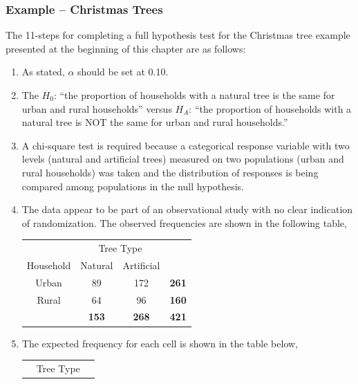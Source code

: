 \documentclass[10pt,openany]{book}\usepackage[]{graphicx}\usepackage[]{color}
\begin{document}
\subsubsection{Example -- Christmas Trees}
The 11-steps  for completing a full hypothesis test for the Christmas tree example presented at the beginning of this chapter are as follows:
  \begin{enumerate}
    \item As stated, $\alpha$ should be set at 0.10.
    \item The $H_{0}$: ``the proportion of households with a natural tree is the same for urban and rural households'' versus $H_{A}$: ``the proportion of households with a natural tree is NOT the same for urban and rural households.''
    \item A chi-square test is required because a categorical response variable with two levels (natural and artificial trees) measured on two populations (urban and rural households) was taken and the distribution of responses is being compared among populations in the null hypothesis.
    \item The data appear to be part of an observational study with no clear indication of randomization.  The observed frequencies are shown in the following table,
      \begin{center}
        \begin{tabular}{c|c|c|c|}
          \multicolumn{1}{c}{} & \multicolumn{2}{c}{Tree Type} & \multicolumn{1}{c}{} \\
          \cline{2-3}
          Household & Natural & Artificial & \multicolumn{1}{c}{} \\
          \hline
          \multicolumn{1}{|c|}{Urban} & 89 & 172 & \textbf{261} \\
          \hline
          \multicolumn{1}{|c|}{Rural} & 64 & 96 & \textbf{160} \\
          \hline
           & \textbf{153} & \textbf{268} & \textbf{421} \\
          \cline{2-4}
        \end{tabular}
      \end{center}
    \item The expected frequency for each cell is shown in the table below,
      \begin{center}
        \begin{tabular}{c|c|c|c|}
          \multicolumn{1}{c}{} & \multicolumn{2}{c}{Tree Type} & \multicolumn{1}{c}{} \\

\end{tabular}
\end{center}
\end{enumerate}
\end{document}
